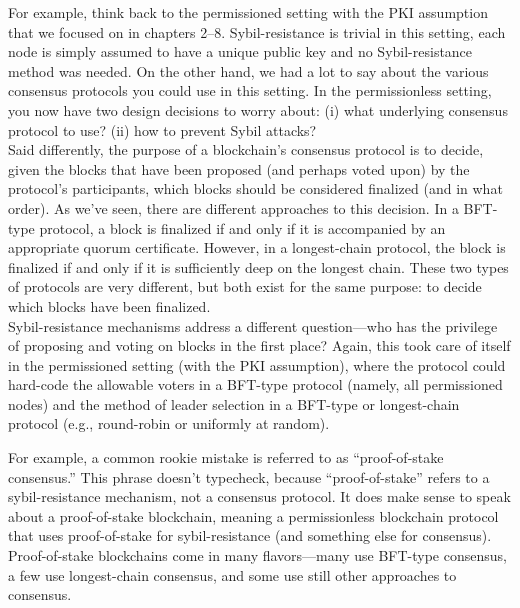 For example, think back to the permissioned setting with the PKI assumption that we
focused on in chapters 2–8. Sybil-resistance is trivial in this setting, each node is simply
assumed to have a unique public key and no Sybil-resistance method was needed. On the
other hand, we had a lot to say about the various consensus protocols you could use in this
setting. In the permissionless setting, you now have two design decisions to worry about: (i)
what underlying consensus protocol to use? (ii) how to prevent Sybil attacks?\\

Said differently, the purpose of a blockchain’s consensus protocol is to decide, given the
blocks that have been proposed (and perhaps voted upon) by the protocol’s participants,
which blocks should be considered finalized (and in what order). As we've seen, there are
different approaches to this decision. In a BFT-type protocol, a block is finalized if and only
if it is accompanied by an appropriate quorum certificate. However, in a longest-chain protocol,
the block is finalized if and only if it is sufficiently deep on the longest chain. These two types of
protocols are very different, but both exist for the same purpose: to decide which
blocks have been finalized.\\

Sybil-resistance mechanisms address a different question—who has the privilege of proposing and voting on blocks in the first place? Again, this took care of itself in the permissioned setting (with the PKI assumption), where the protocol could hard-code the allowable voters
in a BFT-type protocol (namely, all permissioned nodes) and the method of leader selection
in a BFT-type or longest-chain protocol (e.g., round-robin or uniformly at random).


For example, a common rookie mistake is referred to as “proof-of-stake consensus.” This phrase
doesn't typecheck, because “proof-of-stake” refers to a sybil-resistance mechanism, not a
consensus protocol. It does make sense to speak about a proof-of-stake blockchain, meaning a permissionless blockchain protocol that uses proof-of-stake for sybil-resistance (and
something else for consensus). Proof-of-stake blockchains come in many flavors—many use
BFT-type consensus, a few use longest-chain consensus, and some use still other approaches
to consensus.\\

